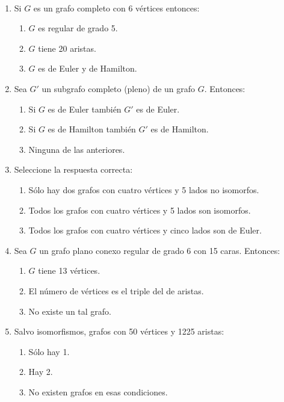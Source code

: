 \begin{ejercicio}\label{ej:1.27}~
    \begin{enumerate}
        \item Si $G$ es un grafo completo con 6 vértices entonces:
        \begin{enumerate}
            \item $G$ es regular de grado 5.
            \item $G$ tiene 20 aristas.
            \item $G$ es de Euler y de Hamilton.
        \end{enumerate}
        \item Sea $G'$ un subgrafo completo (pleno) de un grafo $G$. Entonces:
        \begin{enumerate}
            \item Si $G$ es de Euler también $G'$ es de Euler.
            \item Si $G$ es de Hamilton también $G'$ es de Hamilton.
            \item Ninguna de las anteriores.
        \end{enumerate}
        \item Seleccione la respuesta correcta:
        \begin{enumerate}
            \item Sólo hay dos grafos con cuatro vértices y 5 lados no isomorfos.
            \item Todos los grafos con cuatro vértices y 5 lados son isomorfos.
            \item Todos los grafos con cuatro vértices y cinco lados son de Euler.
        \end{enumerate}
        \item Sea $G$ un grafo plano conexo regular de grado 6 con 15 caras. Entonces:
        \begin{enumerate}
            \item $G$ tiene 13 vértices.
            \item El número de vértices es el triple del de aristas.
            \item No existe un tal grafo.
        \end{enumerate}
        \item Salvo isomorfismos, grafos con 50 vértices y 1225 aristas:
        \begin{enumerate}
            \item Sólo hay 1.
            \item Hay 2.
            \item No existen grafos en esas condiciones.
        \end{enumerate}
    \end{enumerate}
\end{ejercicio}



